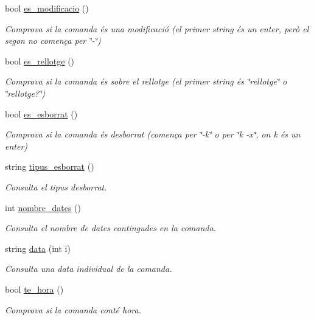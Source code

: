 \begin{DoxyCompactItemize}
bool \hyperlink{class_comanda_a2a33a5497c7d156f22065656cb48d9a1}{es\+\_\+modificacio} ()
\begin{DoxyCompactList}\small\item\em Comprova si la comanda és una modificació (el primer string és un enter, però el segon no comença per \char`\"{}-\/\char`\"{}) \end{DoxyCompactList}\item 
bool \hyperlink{class_comanda_aa8767f298317c3bb07f90676cabb8c43}{es\+\_\+rellotge} ()
\begin{DoxyCompactList}\small\item\em Comprova si la comanda és sobre el rellotge (el primer string és \char`\"{}rellotge\char`\"{} o \char`\"{}rellotge?\char`\"{}) \end{DoxyCompactList}\item 
bool \hyperlink{class_comanda_a9e71320e8617ce224c8d994d0969555a}{es\+\_\+esborrat} ()
\begin{DoxyCompactList}\small\item\em Comprova si la comanda és d\textquotesingle{}esborrat (comença per \char`\"{}-\/k\char`\"{} o per \char`\"{}k -\/x\char`\"{}, on k és un enter) \end{DoxyCompactList}\item 
string \hyperlink{class_comanda_a998dc172668a108837512f818ca5430f}{tipus\+\_\+esborrat} ()
\begin{DoxyCompactList}\small\item\em Consulta el tipus d\textquotesingle{}esborrat. \end{DoxyCompactList}\item 
int \hyperlink{class_comanda_aadabfc85ec7cdeb45039e8952a1ab124}{nombre\+\_\+dates} ()
\begin{DoxyCompactList}\small\item\em Consulta el nombre de dates contingudes en la comanda. \end{DoxyCompactList}\item 
string \hyperlink{class_comanda_ab4ce0a50bde32145d11cbaee753526c7}{data} (int i)
\begin{DoxyCompactList}\small\item\em Consulta una data individual de la comanda. \end{DoxyCompactList}\item 
bool \hyperlink{class_comanda_abf8b926146f3664aacfd24d7800014e5}{te\+\_\+hora} ()
\begin{DoxyCompactList}\small\item\em Comprova si la comanda conté hora. \end{DoxyCompactList}\item 

\end{DoxyCompactItemize}
